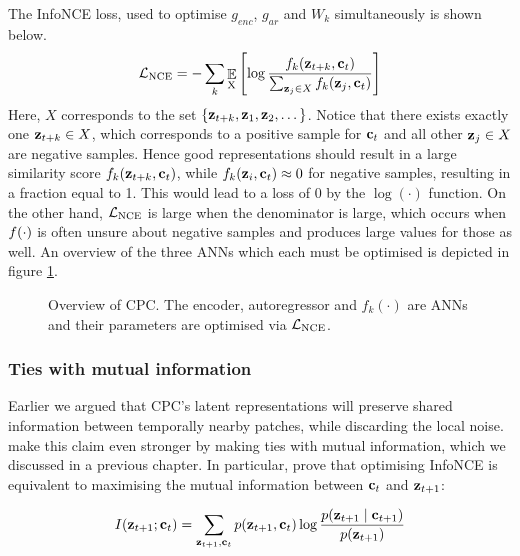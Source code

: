 	The InfoNCE loss, used to optimise $g_{enc}$, $g_{ar}$ and $W_k$ simultaneously is shown below. 
	\begin{equation} %
		\Lnce = - \sum_{k} \expected{\textsubscript{X}} \left[ \log \nceprediction \right] \label{eq:NCE_loss}
	\end{equation}
	Here, $X$ corresponds to the set ${ \left\{ \mathbf{z}_{t+k}, \mathbf{z}_1, \mathbf{z}_2, \dots \right\} }$. Notice that there exists exactly one $\mathbf{z}_{t+k} \in X$, which corresponds to a positive sample for $\mathbf{c}_t$ and all other $\mathbf{z}_j \in X$ are negative samples.  Hence good representations should result in a large similarity score $f_k(\mathbf{z}_{t+k}, \mathbf{c}_t)$, while $f_k(\mathbf{z}_i, \mathbf{c}_t) \approx 0$ for negative samples, resulting in a fraction equal to 1. This would lead to a loss of 0 by the $\log(\cdot)$ function. On the other hand, $\mathcal{L}_{\text{NCE}}$ is large when the denominator is large, which occurs when $f(\cdot)$ is often unsure about negative samples and produces large values for those as well. An overview of the three ANNs which each must be optimised is depicted in figure \ref{fig:cpc-my-overview}.
	

	\begin{figure}
		\hspace{2cm}
		\centering
		

		\caption{Overview of CPC. The encoder, autoregressor and $f_k(\cdot)$ are ANNs and their parameters are optimised via $\mathcal{L}_{\text{NCE}}$.}
		\label{fig:cpc-my-overview}
	\end{figure}
	
	
\subsubsection{Ties with mutual information} \label{cha:bg_cpc_ties_w_mi}
	Earlier we argued that CPC's latent representations will preserve shared information between temporally nearby patches, while discarding the local noise. \cite{oordRepresentationLearningContrastive2019} make this claim even stronger by making ties with mutual information, which we discussed in a previous chapter. In particular, \citeauthor{oordRepresentationLearningContrastive2019} prove that optimising InfoNCE is equivalent to maximising the mutual information between $\mathbf{c}_t$ and $\mathbf{z}_{t+1}$: 
	
	\begin{equation} %
		I(\ztone; \ct) = \sum_{\ztone, \ct} p(\ztone, \ct) \log \frac{p(\ztone \mid \ctone)}{p(\ztone)}
	\end{equation}
	
